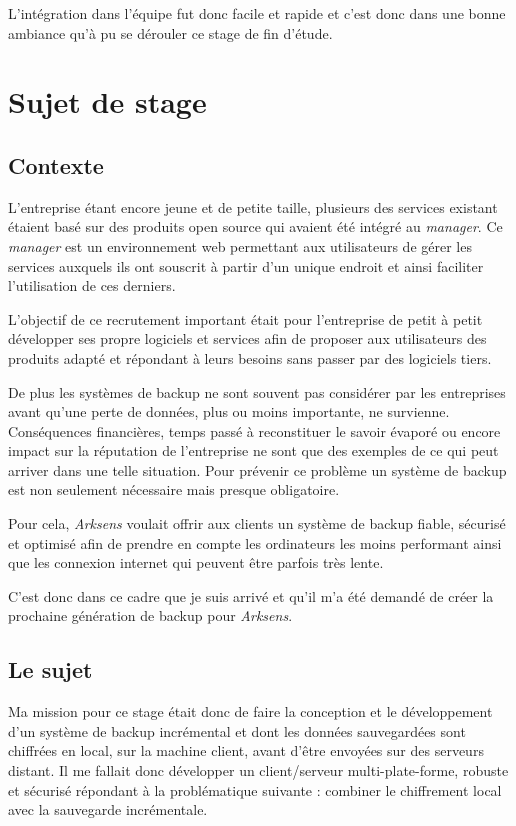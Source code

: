 \documentclass[a4paper,10pt, twoside]{report}
\begin{document}
\begin{spacing}{1.2}
L'int\'egration dans l'\'equipe fut donc facile et rapide et c'est donc dans
une bonne ambiance qu'\`a pu se d\'erouler ce stage de fin d'\'etude.

\section{Sujet de stage}
\subsection{Contexte}
L'entreprise \'etant encore jeune et de petite taille, plusieurs des services
existant \'etaient bas\'e sur des produits open source qui avaient \'et\'e
int\'egr\'e au \textit{manager}. Ce \textit{manager} est un environnement web
permettant aux utilisateurs de g\'erer les services auxquels ils ont souscrit
\`a partir d'un unique endroit et ainsi faciliter l'utilisation de ces derniers.

L'objectif de ce recrutement important \'etait pour l'entreprise de petit \`a
petit d\'evelopper ses propre logiciels et services afin de proposer aux
utilisateurs des produits adapt\'e et r\'epondant \`a leurs besoins sans passer
par des logiciels tiers.

De plus les syst\`emes de backup ne sont souvent pas consid\'erer par les
entreprises avant qu'une perte de donn\'ees, plus ou moins importante,
ne survienne. Cons\'equences financi\`eres, temps pass\'e \`a reconstituer le
savoir \'evapor\'e ou encore impact sur la r\'eputation de l'entreprise ne sont
que des exemples de ce qui peut arriver dans une telle situation. Pour
pr\'evenir ce probl\`eme un syst\`eme de backup est non seulement n\'ecessaire
mais presque obligatoire.

Pour cela, \textit{Arksens} voulait offrir aux clients un syst\`eme de backup
fiable, s\'ecuris\'e et optimis\'e afin de prendre en compte les ordinateurs
les moins performant ainsi que les connexion internet qui peuvent \^etre
parfois tr\`es lente.

C'est donc dans ce cadre que je suis arriv\'e et qu'il m'a \'et\'e demand\'e
de cr\'eer la prochaine g\'en\'eration de backup pour \textit{Arksens}.

\subsection{Le sujet}
Ma mission pour ce stage \'etait donc de faire la conception et le
d\'eveloppement d'un syst\`eme de backup incr\'emental et dont les donn\'ees
sauvegard\'ees sont chiffr\'ees en local, sur la machine client, avant d'\^etre
envoy\'ees sur des serveurs distant. Il me fallait donc d\'evelopper un
client/serveur multi-plate-forme, robuste et s\'ecuris\'e r\'epondant \`a
la probl\'ematique suivante : combiner le chiffrement local avec la sauvegarde
incr\'ementale.


\end{spacing}
\end{document}
